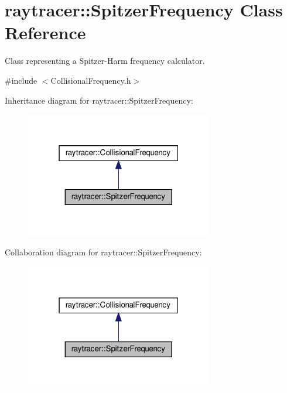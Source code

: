 \hypertarget{classraytracer_1_1SpitzerFrequency}{}\section{raytracer\+:\+:Spitzer\+Frequency Class Reference}
\label{classraytracer_1_1SpitzerFrequency}


Class representing a Spitzer-\/\+Harm frequency calculator.  




{\ttfamily \#include $<$Collisional\+Frequency.\+h$>$}



Inheritance diagram for raytracer\+:\+:Spitzer\+Frequency\+:
\nopagebreak
\begin{figure}[H]
\begin{center}
\leavevmode
\includegraphics[width=232pt]{classraytracer_1_1SpitzerFrequency__inherit__graph}
\end{center}
\end{figure}


Collaboration diagram for raytracer\+:\+:Spitzer\+Frequency\+:
\nopagebreak
\begin{figure}[H]
\begin{center}
\leavevmode
\includegraphics[width=232pt]{classraytracer_1_1SpitzerFrequency__coll__graph}
\end{center}
\end{figure}
